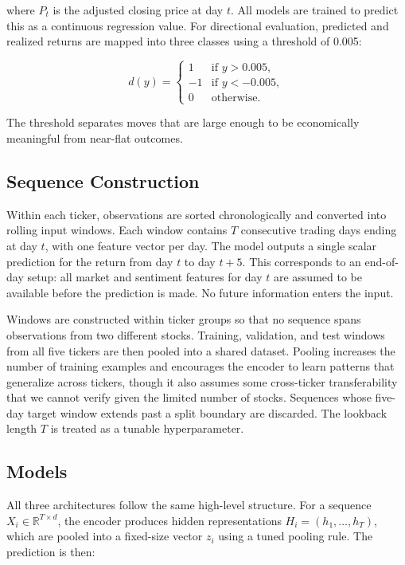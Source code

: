 \documentclass[10pt,twocolumn]{article}
\begin{document}
where $P_t$ is the adjusted closing price at day $t$. All models are trained to predict this as a continuous regression value. For directional evaluation, predicted and realized returns are mapped into three classes using a threshold of 0.005:

\begin{equation}
d(y) =
\begin{cases}
1 & \text{if } y > 0.005, \\
-1 & \text{if } y < -0.005, \\
0 & \text{otherwise.}
\end{cases}
\end{equation}

The threshold separates moves that are large enough to be economically meaningful from near-flat outcomes.

\subsection{Sequence Construction}

Within each ticker, observations are sorted chronologically and converted into rolling input windows. Each window contains $T$ consecutive trading days ending at day $t$, with one feature vector per day. The model outputs a single scalar prediction for the return from day $t$ to day $t+5$. This corresponds to an end-of-day setup: all market and sentiment features for day $t$ are assumed to be available before the prediction is made. No future information enters the input.

Windows are constructed within ticker groups so that no sequence spans observations from two different stocks. Training, validation, and test windows from all five tickers are then pooled into a shared dataset. Pooling increases the number of training examples and encourages the encoder to learn patterns that generalize across tickers, though it also assumes some cross-ticker transferability that we cannot verify given the limited number of stocks. Sequences whose five-day target window extends past a split boundary are discarded. The lookback length $T$ is treated as a tunable hyperparameter.

\subsection{Models}

All three architectures follow the same high-level structure. For a sequence $X_i \in \mathbb{R}^{T \times d}$, the encoder produces hidden representations $H_i = (h_1,\ldots,h_T)$, which are pooled into a fixed-size vector $z_i$ using a tuned pooling rule. The prediction is then:
\end{document}
